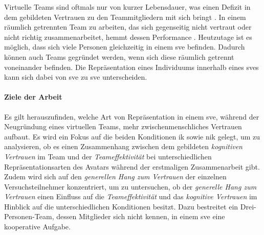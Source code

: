 \documentclass[a4paper,11pt]{article}%
\renewcommand{\\}{\vspace*{0.5\baselineskip} \newline}
\begin{document}
Virtuelle Teams sind oftmals nur von kurzer Lebensdauer, was einen Defizit in dem gebildeten Vertrauen zu den Teammitgliedern mit sich bringt \citep{wong2000virtual}.
In einem räumlich getrennten Team zu arbeiten, das sich gegenseitig nicht vertraut oder nicht richtig zusammenarbeitet, hemmt dessen Performance \citep[S. 98-107]{huang1998supporting} \citep[S. 399-417]{turoff1993distributed}.
Heutzutage ist es möglich, dass sich viele Personen gleichzeitig in einem \ac{sve} befinden. Dadurch können auch Teams gegründet werden, wenn sich diese räumlich getrennt voneinander befinden. Die Repräsentation eines Individuums innerhalb eines \ac{sve}s kann sich dabei von \ac{sve} zu \ac{sve} unterscheiden.
	
	\paragraph{Ziele der Arbeit}
%


Es gilt herauszufinden, welche Art von Repräsentation in einem \ac{sve}, während der Neugründung eines virtuellen Teams, mehr zwischenmenschliches Vertrauen aufbaut. Es wird ein Fokus auf die beiden Konditionen \ac{ik} sowie \ac{nik} gelegt, um zu analysieren, ob es einen Zusammenhang zwischen dem gebildeten \textit{kognitiven Vertrauen} im Team und der \textit{Teameffektivität} bei unterschiedlichen Repräsentationsarten des Avatars während der erstmaligen Zusammenarbeit gibt.
Zudem wird sich auf den \textit{generellen Hang zum Vertrauen} der einzelnen Versuchsteilnehmer konzentriert, um zu untersuchen, ob der \textit{generelle Hang zum Vertrauen} einen Einfluss auf die \textit{Teameffektivität} und das \textit{kognitive Vertrauen} im Hinblick auf die unterschiedlichen Konditionen besitzt. Dazu bestreitet ein Drei-Personen-Team, dessen Mitglieder sich nicht kennen, in einem \ac{sve} eine kooperative Aufgabe.
\end{document}
